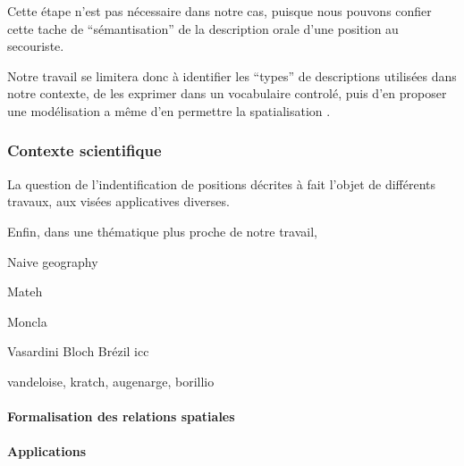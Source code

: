 Cette étape n'est pas nécessaire dans notre cas, puisque nous pouvons
confier cette tache de \enquote{sémantisation} de la description orale
d'une position au secouriste. 

Notre travail se limitera donc à identifier les \enquote{types} de
descriptions utilisées dans notre contexte, de les exprimer dans un
vocabulaire controlé, puis d'en proposer une modélisation a même d'en
permettre la spatialisation .

\subsubsection{Contexte scientifique}

La question de l'indentification de positions décrites à fait l'objet
de différents travaux, aux visées applicatives diverses.



Enfin, dans une thématique plus proche de notre travail,  

Naive geography

Mateh

Moncla



Vasardini
Bloch
Brézil icc\autocite{Egenhofer1995}

vandeloise, kratch, augenarge, borillio 

\paragraph{Formalisation des relations spatiales}
\autocite{Vandeloise1986,Borillo1998,Bateman2010}
\autocite{Kracht2002}
\autocite{Aurnague1993}
\autocite{Mark1999}
\autocite{Freksa2018}
\autocite{Carlson2005}
\autocite{Lang1991}

\autocite{Hois2008}
\autocite{Frank1992}
\autocite{Moratz2008,Cohn2001}
\autocite{Kordjamshidi2012}
\autocite{Matsakis2010}
\autocite{Frank1997}
\autocite{Talmy2005}
\autocite{Freeman1975}
\autocite{Zelinsky-Wibbelt1993}
\autocite{Carlson2004}
\autocite{Gui-Wu2009}

\paragraph{Applications}
\autocite{Xu2007a,Xu2007,Xu2006}
\autocite{Wolter2018}
\autocite{Dittrich2015}
\autocite{Vanegas2011}
\autocite{Du2016}
\autocite{Hornsby2009}
\autocite{Mathet2000}
\autocite{Hudelot2008a}
\autocite{Bloch1996}
\autocite{Hudelot2008}
\autocite{Levit2007}
\autocite{Evans2008}
\autocite{Takemura2012}
\autocite{Shariff1998}
\autocite{Skubic2004}
\autocite{Hall2015}
\autocite{Leopold2015}
\autocite{Denis1997}

